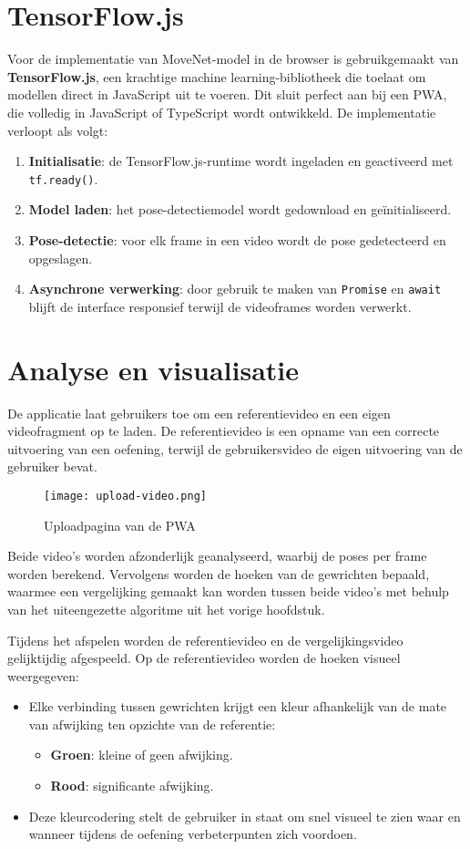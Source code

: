 \section{TensorFlow.js}
Voor de implementatie van MoveNet-model in de browser is gebruikgemaakt van \textbf{TensorFlow.js}, een krachtige machine learning-bibliotheek die toelaat om modellen direct in JavaScript uit te voeren. 
Dit sluit perfect aan bij een PWA, die volledig in JavaScript of TypeScript wordt ontwikkeld.
De implementatie verloopt als volgt:
\begin{enumerate}
    \item \textbf{Initialisatie}: de TensorFlow.js-runtime wordt ingeladen en geactiveerd met \verb|tf.ready()|.
    \item \textbf{Model laden}: het pose-detectiemodel wordt gedownload en geïnitialiseerd.
    \item \textbf{Pose-detectie}: voor elk frame in een video wordt de pose gedetecteerd en opgeslagen.
    \item \textbf{Asynchrone verwerking}: door gebruik te maken van \verb|Promise| en \verb|await| blijft de interface responsief terwijl de videoframes worden verwerkt.
\end{enumerate}

\section{Analyse en visualisatie}
De applicatie laat gebruikers toe om een referentievideo en een eigen videofragment op te laden. 
De referentievideo is een opname van een correcte uitvoering van een oefening, terwijl de gebruikersvideo de eigen uitvoering van de gebruiker bevat.
\begin{figure}
  \centering
  \texttt{[image: upload-video.png]}
  \caption[Upload page]{\label{fig:upload_page}Uploadpagina van de PWA}
\end{figure}

Beide video’s worden afzonderlijk geanalyseerd, waarbij de poses per frame worden berekend. 
Vervolgens worden de hoeken van de gewrichten bepaald, waarmee een vergelijking gemaakt kan worden tussen beide video’s met behulp van het uiteengezette algoritme uit het vorige hoofdstuk.

Tijdens het afspelen worden de referentievideo en de vergelijkingsvideo gelijktijdig afgespeeld. Op de referentievideo worden de hoeken visueel weergegeven:
\begin{itemize}
    \item Elke verbinding tussen gewrichten krijgt een kleur afhankelijk van de mate van afwijking ten opzichte van de referentie:
    \begin{itemize}
        \item \textbf{Groen}: kleine of geen afwijking.
        \item \textbf{Rood}: significante afwijking.
    \end{itemize}
    \item Deze kleurcodering stelt de gebruiker in staat om snel visueel te zien waar en wanneer tijdens de oefening verbeterpunten zich voordoen.
\end{itemize}


